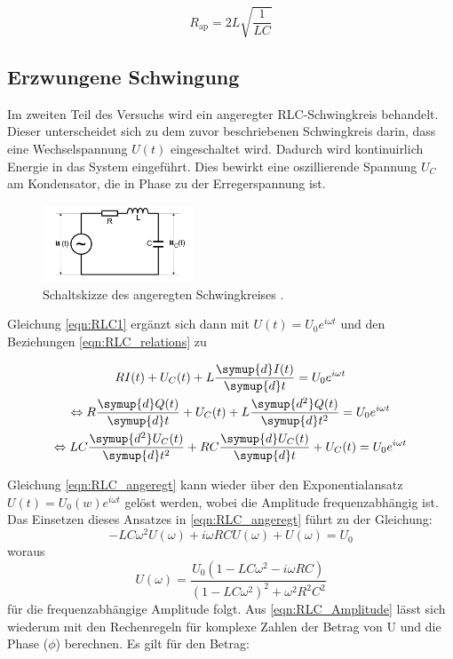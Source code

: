 \begin{equation}
    \label{eqn:R_ap}
    R_\text{ap} =2L \sqrt{\frac{1}{LC}}
\end{equation}




\subsection{Erzwungene Schwingung}
\label{sec:Theorie_2}

Im zweiten Teil des Versuchs wird ein angeregter RLC-Schwingkreis behandelt. Dieser unterscheidet sich zu dem zuvor
beschriebenen Schwingkreis darin, dass eine Wechselspannung $U(t)$ eingeschaltet wird. Dadurch wird kontinuirlich Energie in das 
System eingeführt. Dies bewirkt eine oszillierende Spannung $U_C$ am Kondensator, die in Phase zu der Erregerspannung ist.

\begin{figure}
	\centering
    \includegraphics[width=0.4\textwidth]{content/RLC_angeregt.pdf}
	\caption{Schaltskizze des angeregten Schwingkreises \cite{v354}.}
	\label{fig:RLC_angeregt}
\end{figure}

Gleichung \eqref{eqn:RLC1} ergänzt sich dann mit $U(t) = U_0e^{i\omega t}$ und den Beziehungen \eqref{eqn:RLC_relations} zu

\begin{gather}  
    R I(t) + U_C(t) + L \frac{\symup{d}I(t)}{\symup{d}t} = U_0e^{i\omega t} \nonumber \\
    \Leftrightarrow R \frac{\symup{d}Q(t)}{\symup{d}t} + U_C(t)    + L \frac{\symup{d^2}Q(t)}{\symup{d}t^2} = U_0e^{i\omega t} \nonumber \\
    \Leftrightarrow LC \frac{\symup{d^2}U_C(t)}{\symup{d}t^2} + RC \frac{\symup{d}U_C(t)}{\symup{d}t} + U_C(t) = U_0e^{i\omega t}
    \label{eqn:RLC_angeregt}
\end{gather}

Gleichung \eqref{eqn:RLC_angeregt} kann wieder über den Exponentialansatz $U(t) = U_0(w)e^{i\omega t}$ gelöst werden,
wobei die Amplitude frequenzabhängig ist. Das Einsetzen dieses Ansatzes in \eqref{eqn:RLC_angeregt} führt zu der Gleichung:
\begin{equation*}
    -LC\omega^2 U(\omega) + i\omega RC U(\omega) + U(\omega) = U_0
\end{equation*}
woraus 
\begin{equation}
    \label{eqn:RLC_Amplitude}
    U(\omega) = \frac{U_0 (1-LC\omega^2-i\omega RC)}{(1-LC\omega^2)^2+\omega^2 R^2 C^2}
\end{equation}
für die frequenzabhängige Amplitude folgt. Aus \eqref{eqn:RLC_Amplitude} lässt sich wiederum mit den Rechenregeln für
komplexe Zahlen der Betrag von U und die Phase ($\phi$) berechnen. Es gilt für den Betrag:

